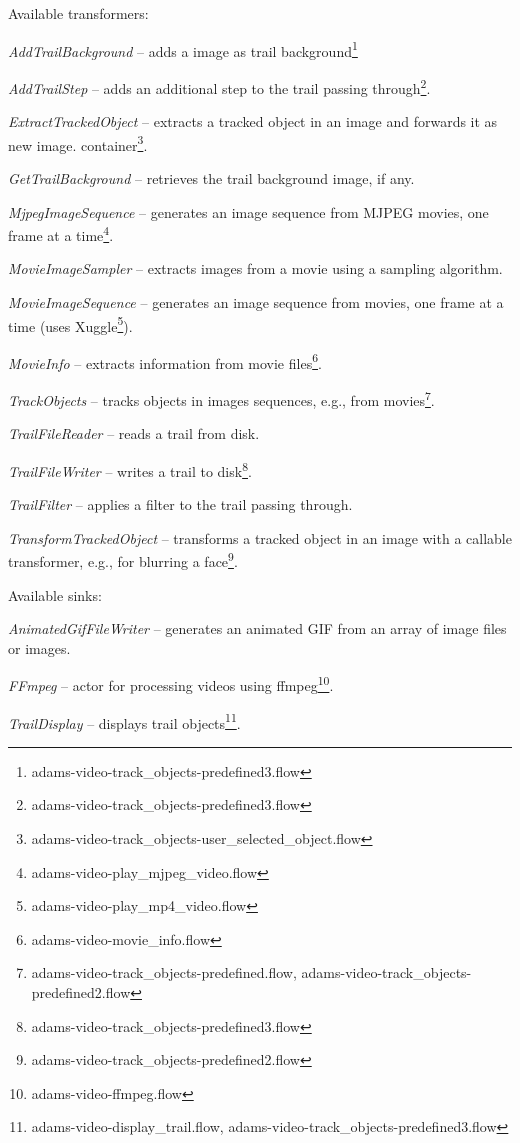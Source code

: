 \documentclass[a4paper]{book}
\begin{document}
\noindent Available transformers:
\begin{tight_itemize}
	\item \textit{AddTrailBackground} -- adds a image as trail
	background\footnote{adams-video-track\_objects-predefined3.flow}
	\item \textit{AddTrailStep} -- adds an additional step to the trail
	passing through\footnote{adams-video-track\_objects-predefined3.flow}.
	\item \textit{ExtractTrackedObject} -- extracts a tracked
	object in an image and forwards it as new image.
	container\footnote{adams-video-track\_objects-user\_selected\_object.flow}.
	\item \textit{GetTrailBackground} -- retrieves the trail background image, if any.
	\item \textit{MjpegImageSequence} -- generates an image sequence
	from MJPEG movies, one frame at a time\footnote{adams-video-play\_mjpeg\_video.flow}.
	\item \textit{MovieImageSampler} -- extracts images from a movie using a sampling algorithm.
	\item \textit{MovieImageSequence} -- generates an image sequence
	from movies, one frame at a time (uses Xuggle\cite{xuggle}\footnote{adams-video-play\_mp4\_video.flow}).
	\item \textit{MovieInfo} -- extracts information from movie files\footnote{adams-video-movie\_info.flow}.
	\item \textit{TrackObjects} -- tracks objects in images sequences,
	e.g., from movies\footnote{adams-video-track\_objects-predefined.flow, adams-video-track\_objects-predefined2.flow}.
	\item \textit{TrailFileReader} -- reads a trail from disk.
	\item \textit{TrailFileWriter} -- writes a trail to disk\footnote{adams-video-track\_objects-predefined3.flow}.
	\item \textit{TrailFilter} -- applies a filter to the trail passing through.
	\item \textit{TransformTrackedObject} -- transforms a tracked
	object in an image with a callable transformer, e.g., for blurring a
	face\footnote{adams-video-track\_objects-predefined2.flow}.
\end{tight_itemize}

\noindent Available sinks:
\begin{tight_itemize}
  \item \textit{AnimatedGifFileWriter} -- generates an animated GIF from
  an array of image files or images.
  \item \textit{FFmpeg} -- actor for processing videos using
  ffmpeg\cite{ffmpeg}\footnote{adams-video-ffmpeg.flow}.
  \item \textit{TrailDisplay} -- displays trail objects\footnote{adams-video-display\_trail.flow, adams-video-track\_objects-predefined3.flow}.
\end{tight_itemize}
\end{document}
